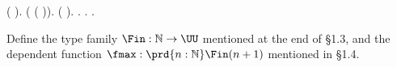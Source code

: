 \begin{coqdoccode}
\coqdocindent{1.00em}
 (\coqdocvar{\_}  \coqdocnotation{(} \coqdocvar{\_} \coqdocvar{\_} \coqdocvar{\_}\coqdocnotation{)\^{}}).\coqdoceol
\coqdocindent{1.00em}
 ( ( )).  (  \coqdocvar{\_}).  .\coqdoceol
\coqdocnoindent
{}.\coqdoceol
\coqdocemptyline
\coqdocnoindent
{}\coqdocindent{0.50em}
  .\coqdoceol
\coqdocemptyline
\end{coqdoccode}
Define the type family $\Fin : \mathbb{N} \to \UU$ mentioned at the end of
\S1.3, and the dependent function $\fmax : \prd{n : \mathbb{N}} \Fin(n + 1)$
mentioned in \S1.4. 

